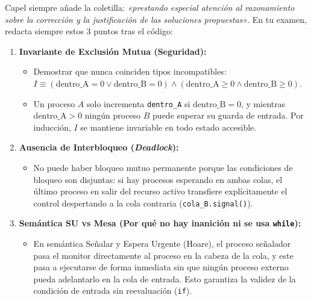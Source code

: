 \documentclass[11pt,a4paper]{article}
\begin{document}
\begin{tcolorbox}[colback=scdLightGreen,colframe=scdGreen,title=\textbf{Justificación Teórica Obligatoria para Obtener el 10 en el Examen de Capel},arc=3pt]
\small
Capel siempre añade la coletilla: \textit{«prestando especial atención al razonamiento sobre la corrección y la justificación de las soluciones propuestas»}. En tu examen, redacta siempre estos 3 puntos tras el código:
\begin{enumerate}[leftmargin=*,itemsep=1.5pt]
    \item \textbf{Invariante de Exclusión Mutua (Seguridad):}
    \begin{itemize}[leftmargin=*,itemsep=0.5pt]
        \item Demostrar que nunca coinciden tipos incompatibles: $I \equiv (\text{dentro\_A} = 0 \lor \text{dentro\_B} = 0) \land (\text{dentro\_A} \ge 0 \land \text{dentro\_B} \ge 0)$.
        \item Un proceso $A$ solo incrementa \texttt{dentro\_A} si $\text{dentro\_B} = 0$, y mientras $\text{dentro\_A} > 0$ ningún proceso $B$ puede superar su guarda de entrada. Por inducción, $I$ se mantiene invariable en todo estado accesible.
    \end{itemize}
    \item \textbf{Ausencia de Interbloqueo (\textit{Deadlock}):}
    \begin{itemize}[leftmargin=*,itemsep=0.5pt]
        \item No puede haber bloqueo mutuo permanente porque las condiciones de bloqueo son disjuntas: si hay procesos esperando en ambas colas, el último proceso en salir del recurso activo transfiere explícitamente el control despertando a la cola contraria (\texttt{cola\_B.signal()}).
    \end{itemize}
    \item \textbf{Semántica SU vs Mesa (Por qué no hay inanición ni se usa \texttt{while}):}
    \begin{itemize}[leftmargin=*,itemsep=0.5pt]
        \item En semántica Señalar y Espera Urgente (Hoare), el proceso señalador pasa el monitor directamente al proceso en la cabeza de la cola, y este pasa a ejecutarse de forma inmediata sin que ningún proceso externo pueda adelantarlo en la cola de entrada. Esto garantiza la validez de la condición de entrada sin reevaluación (\texttt{if}).
    \end{itemize}
\end{enumerate}
\end{tcolorbox}
\end{document}
